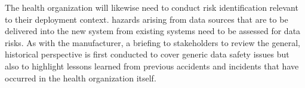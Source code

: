 \begin{minipage}[t]{0.73\textwidth}
  The health organization will likewise need to conduct risk identification relevant to their deployment context. \Glspl{hazard} arising from data sources that are to be delivered into the new system from existing systems need to be assessed for data risks.
  As with the manufacturer, a briefing to \glspl{stakeholder} to review the general, historical perspective is first conducted to cover generic data safety issues but also to highlight lessons learned from previous accidents and incidents that have occurred in the health organization itself.
\end{minipage}
\begin{minipage}[t]{0.25\textwidth}
  \centering{}
\end{minipage}

